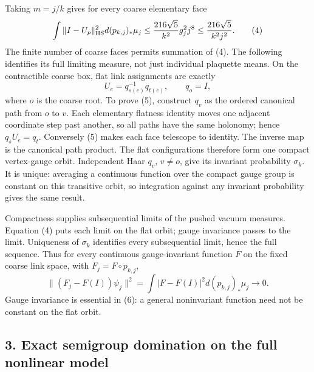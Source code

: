 \documentclass[
  11pt,
]{article}
\begin{document}
Taking \(m=j/k\) gives for every coarse elementary face \[
 \int\|I-U_p\|_{\rm HS}^2d(p_{k,j})_*\mu_j
 \le\frac{216\sqrt5}{k^2}g_j^2j^8
 \le\frac{216\sqrt5}{k^2j^2}.
 \tag{4}
\] The finite number of coarse faces permits summation of (4). The
following identifies its full limiting measure, not just individual
plaquette means. On the contractible coarse box, flat link assignments
are exactly \[
 U_e=q_{s(e)}^{-1}q_{t(e)},\qquad q_o=I,
 \tag{5}
\] where \(o\) is the coarse root. To prove (5), construct \(q_v\) as
the ordered canonical path from \(o\) to \(v\). Each elementary flatness
identity moves one adjacent coordinate step past another, so all paths
have the same holonomy; hence \(q_sU_e=q_t\). Conversely (5) makes each
face telescope to identity. The inverse map is the canonical path
product. The flat configurations therefore form one compact vertex-gauge
orbit. Independent Haar \(q_v\), \(v\ne o\), give its invariant
probability \(\sigma_k\). It is unique: averaging a continuous function
over the compact gauge group is constant on this transitive orbit, so
integration against any invariant probability gives the same result.

Compactness supplies subsequential limits of the pushed vacuum measures.
Equation (4) puts each limit on the flat orbit; gauge invariance passes
to the limit. Uniqueness of \(\sigma_k\) identifies every subsequential
limit, hence the full sequence. Thus for every continuous
gauge-invariant function \(F\) on the fixed coarse link space, with
\(F_j=F\circ p_{k,j}\), \[
 \|(F_j-F(I))\psi_j\|^2
 =\int|F-F(I)|^2d(p_{k,j})_*\mu_j\longrightarrow0 .
 \tag{6}
\] Gauge invariance is essential in (6): a general noninvariant function
need not be constant on the flat orbit.

\subsection{3. Exact semigroup domination on the full nonlinear
model}\label{weak-coupling-part-6-exact-semigroup-domination-on-the-full-nonlinear-model}
\end{document}
